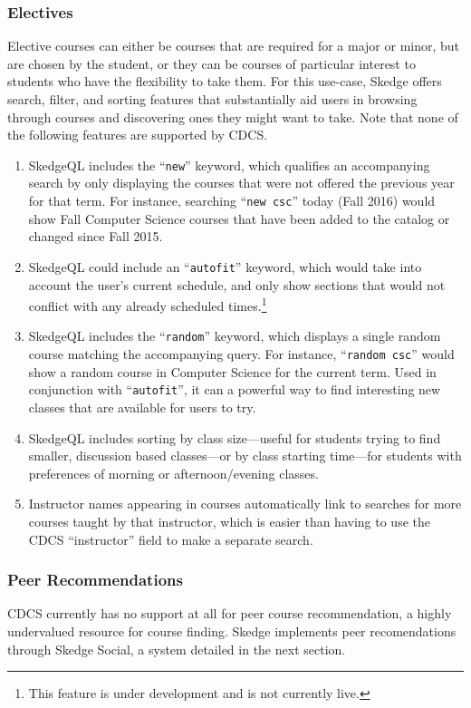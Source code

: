   \subsubsection{Electives}

  Elective courses can either be courses that are required for a major or minor, but are chosen by the student, or they can be courses of particular interest to students who have the flexibility to take them. For this use-case, Skedge offers search, filter, and sorting features that substantially aid users in browsing through courses and discovering ones they might want to take. Note that none of the following features are supported by CDCS.

  \begin{enumerate}

    \item SkedgeQL includes the ``{\tt new}'' keyword, which qualifies an accompanying search by only displaying the courses that were not offered the previous year for that term. For instance, searching ``{\tt new csc}'' today (Fall 2016) would show Fall Computer Science courses that have been added to the catalog or changed since Fall 2015.
    \item SkedgeQL could include an ``{\tt autofit}'' keyword, which would take into account the user's current schedule, and only show sections that would not conflict with any already scheduled times.\footnote{This feature is under development and is not currently live.}
    \item SkedgeQL includes the ``{\tt random}'' keyword, which displays a single random course matching the accompanying query. For instance, ``{\tt random csc}'' would show a random course in Computer Science for the current term. Used in conjunction with ``{\tt autofit}'', it can a powerful way to find interesting new classes that are available for users to try.
    \item SkedgeQL includes sorting by class size---useful for students trying to find smaller, discussion based classes---or by class starting time---for students with preferences of morning or afternoon/evening classes.
    \item Instructor names appearing in courses automatically link to searches for more courses taught by that instructor, which is easier than having to use the CDCS ``instructor'' field to make a separate search.

  \end{enumerate}

  \subsubsection{Peer Recommendations}

  CDCS currently has no support at all for peer course recommendation, a highly undervalued resource for course finding. Skedge implements peer recomendations through Skedge Social, a system detailed in the next section.
  